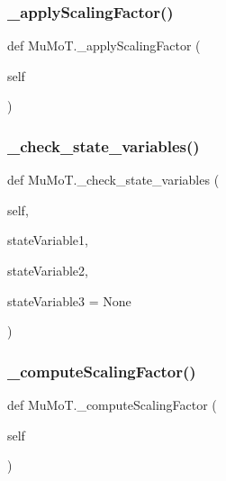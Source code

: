 \subsubsection{\texorpdfstring{\+\_\+apply\+Scaling\+Factor()}{\_applyScalingFactor()}}
{\footnotesize\ttfamily def Mu\+Mo\+T.\+\_\+apply\+Scaling\+Factor (\begin{DoxyParamCaption}\item[{}]{self }\end{DoxyParamCaption})\hspace{0.3cm}{\ttfamily [private]}}

\mbox{\label{namespace_mu_mo_t_a3a032b0b3b421988fa1b5fce2baeb833}} 
\subsubsection{\texorpdfstring{\+\_\+check\+\_\+state\+\_\+variables()}{\_check\_state\_variables()}}
{\footnotesize\ttfamily def Mu\+Mo\+T.\+\_\+check\+\_\+state\+\_\+variables (\begin{DoxyParamCaption}\item[{}]{self,  }\item[{}]{state\+Variable1,  }\item[{}]{state\+Variable2,  }\item[{}]{state\+Variable3 = {\ttfamily None} }\end{DoxyParamCaption})\hspace{0.3cm}{\ttfamily [private]}}

\mbox{\label{namespace_mu_mo_t_a762b2b53a71dbe1fee62f0498ce9cd14}} 
\subsubsection{\texorpdfstring{\+\_\+compute\+Scaling\+Factor()}{\_computeScalingFactor()}}
{\footnotesize\ttfamily def Mu\+Mo\+T.\+\_\+compute\+Scaling\+Factor (\begin{DoxyParamCaption}\item[{}]{self }\end{DoxyParamCaption})\hspace{0.3cm}{\ttfamily [private]}}

